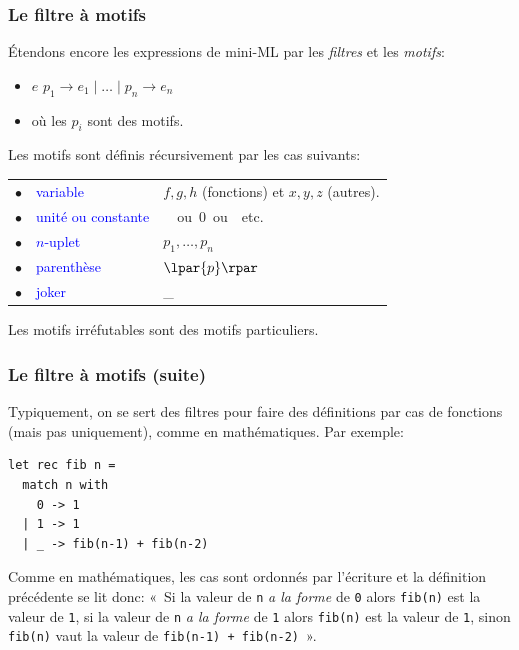 
%
\begin{frame}
\frametitle{Le filtre à motifs}

Étendons encore les expressions de mini-ML par les \emph{filtres} et
les \emph{motifs}:
\begin{itemize}

  \item \Xmatch{} $e$ \Xwith{} $p_1 \rightarrow e_1 \mid \ldots \mid
    p_n \rightarrow e_n$

  \item où les $p_i$ sont des motifs.

\end{itemize}

\bigskip

Les motifs sont définis récursivement par les cas suivants:

\bigskip

\begin{tabular}{rll}
    $\bullet$
  & \textcolor{blue}{variable}
  & $f, g, h$ (fonctions) et $x, y, z$ (autres). \\
    $\bullet$
  & \textcolor{blue}{unité ou constante}
  & \unit \ ou \textsf{0} ou \Xtrue{} etc.\\
    $\bullet$
  & \textcolor{blue}{$n$-uplet}
  & $p_1, \ldots, p_n$\\
    $\bullet$
  & \textcolor{blue}{parenthèse}
  & $\lpar{p}\rpar$\\
    $\bullet$
  & \textcolor{blue}{joker}
  & {\Large \_}
\end{tabular}

\bigskip

\remarque \quad Les motifs irréfutables sont des motifs particuliers.

\end{frame}

%
\begin{frame}[containsverbatim]
\frametitle{Le filtre à motifs (suite)}

Typiquement, on se sert des filtres pour faire des définitions par cas
de fonctions (mais pas uniquement), comme en mathématiques. Par exemple:
{\small
\begin{verbatim}
let rec fib n =
  match n with
    0 -> 1
  | 1 -> 1
  | _ -> fib(n-1) + fib(n-2)
\end{verbatim}
}Comme en mathématiques, les cas sont ordonnés par l'écriture et la
définition précédente se lit donc: «~Si la valeur de \texttt{n}
  \emph{a la forme} de \texttt{0} alors \texttt{fib(n)} est la valeur
  de \texttt{1}, si la valeur de \texttt{n} \emph{a la forme} de
  \texttt{1} alors \texttt{fib(n)} est la valeur de \texttt{1}, sinon
  \texttt{fib(n)} vaut la valeur de \texttt{fib(n-1) + fib(n-2)}~».

\end{frame}

